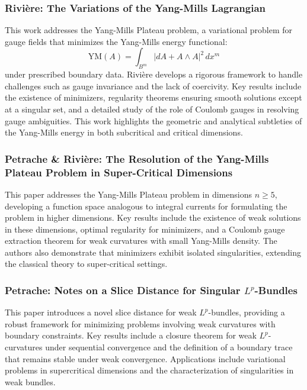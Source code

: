 \documentclass[10pt, letterpaper]{article}
\begin{document}
\subsubsection{Rivière: The Variations of the Yang-Mills Lagrangian \cite{riviere2015yangmills}} 
This work addresses the Yang-Mills Plateau problem, a variational problem for gauge fields that minimizes the Yang-Mills energy functional:
$$
\text{YM}(A) = \int_{B^m} |dA + A \wedge A|^2 \, dx^m
$$
under prescribed boundary data. Rivière develops a rigorous framework to handle challenges such as gauge invariance and the lack of coercivity. Key results include the existence of minimizers, regularity theorems ensuring smooth solutions except at a singular set, and a detailed study of the role of Coulomb gauges in resolving gauge ambiguities. This work highlights the geometric and analytical subtleties of the Yang-Mills energy in both subcritical and critical dimensions.


\subsubsection{Petrache \& Rivière: The Resolution of the Yang-Mills Plateau Problem in Super-Critical Dimensions \cite{petrache2016yangmills}} 
This paper addresses the Yang-Mills Plateau problem in dimensions \(n \geq 5\), developing a function space analogous to integral currents for formulating the problem in higher dimensions. Key results include the existence of weak solutions in these dimensions, optimal regularity for minimizers, and a Coulomb gauge extraction theorem for weak curvatures with small Yang-Mills density. The authors also demonstrate that minimizers exhibit isolated singularities, extending the classical theory to super-critical settings.


\subsubsection{Petrache: Notes on a Slice Distance for Singular \(L^p\)-Bundles \cite{petrache2014slicedistance}} 
This paper introduces a novel slice distance for weak \(L^p\)-bundles, providing a robust framework for minimizing problems involving weak curvatures with boundary constraints. Key results include a closure theorem for weak \(L^p\)-curvatures under sequential convergence and the definition of a boundary trace that remains stable under weak convergence. Applications include variational problems in supercritical dimensions and the characterization of singularities in weak bundles.
\end{document}
